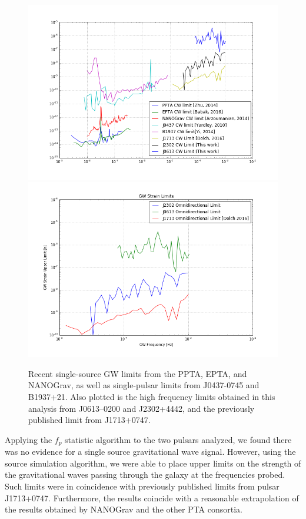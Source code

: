 \documentclass[12pt]{article}
\begin{document}
\begin{figure}
    \caption{Recent single-source GW limits from the PPTA, EPTA, and NANOGrav,
as well as single-pulsar limits from J0437-0745 and B1937+21. Also plotted is
the high frequency limits obtained in this analysis from J0613--0200 and
J2302+4442, and the previously published limit from J1713+0747.}
    \includegraphics[width=1\textwidth]{./figures/all_limits.png}
    \includegraphics[width=1\textwidth]{./figures/hf_limits.png}
\end{figure}

Applying the $f_p$ statistic algorithm to the two pulsars analyzed, we found
there was no evidence for a single source gravitational wave signal. However,
using the source simulation algorithm, we were able to place upper limits on the
strength of the gravitational waves passing through the galaxy at the
frequencies probed. Such limits were in coincidence with previously published
limits from pulsar J1713+0747. Furthermore, the results coincide with a
reasonable extrapolation of the results obtained by NANOGrav and the other PTA
consortia.
\end{document}

